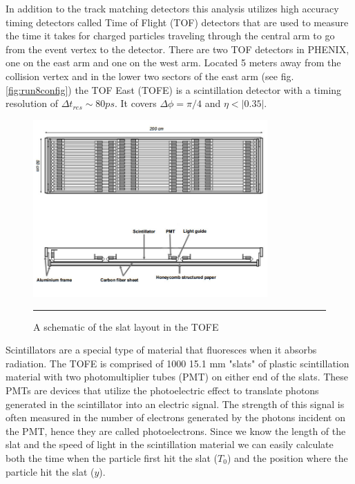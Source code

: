 In addition to the track matching detectors this analysis utilizes high accuracy timing detectors called Time of Flight (TOF) detectors that are used to measure the time it takes for charged particles traveling through the central arm to go from the event vertex to the detector\citep{TOFfocus}. There are two TOF detectors in PHENIX, one on the east arm and one on the west arm. Located 5 meters away from the collision vertex and in the lower two sectors of the east arm (see fig. \ref{fig:run8config}) the TOF East (TOFE) is a scintillation detector with a timing resolution of $\Delta t_{res} \sim 80 ps$. It covers $\Delta\phi = \pi / 4$ and $\eta < |0.35|$. 

\begin{figure}[htbp]
  \centering
    \includegraphics[width=0.8\textwidth]{Figures/TOFEschematic.jpg}
    \rule{35em}{0.5pt}
  \caption[A schematic of the slat layout in the TOFE]{A schematic of the slat layout in the TOFE}
  \label{fig:TOFEschematic}
\end{figure}

Scintillators are a special type of material that fluoresces when it absorbs radiation. The TOFE is comprised of 1000 15.1 mm "slats" of plastic scintillation material with two photomultiplier tubes (PMT) on either end of the slats. These PMTs are devices that utilize the photoelectric effect to translate photons generated in the scintillator into an electric signal. The strength of this signal is often measured in the number of electrons generated by the photons incident on the PMT, hence they are called photoelectrons. Since we know the length of the slat and the speed of light in the scintillation material we can easily calculate both the time when the particle first hit the slat ($T_{0}$) and the position where the particle hit the slat ($y$).

